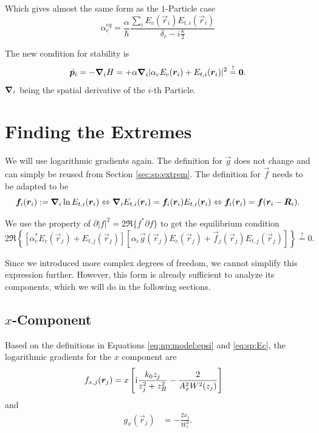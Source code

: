 Which gives almost the same form as the $1$-Particle case
\begin{equation}
    \alpha_c^{eq} = \frac\alpha\hbar \frac{\sum_i E_c(\vec r_i) E_{t,i}(\vec r_i)}{\delta_c - i\frac{\kappa}{2}}
\end{equation}

The new condition for stability is
\begin{equation}
    \dot{\bm{p}_i} 
        = -\bm{\nabla}_{i} H 
        = + \alpha \bm{\nabla}_i|\alpha_c E_c(\bm{r}_i) + E_{t,i}(\bm{r}_i)|^2 \overset{!}{=}\bm{0}.
\end{equation}
$\bm{\nabla}_i$ being the spatial derivative of the $i$-th Particle.

\section{Finding the Extremes}
\label{sec:np:extrem}

We will use logarithmic gradients again.
The definition for $\vec g$ does not change and can simply be reused from Section \ref{sec:sp:extrem}.
The definition for $\vec f$ needs to be adapted to be
\begin{equation}
    \bm{f}_i(\bm{r}_i) := \bm{\nabla}_i \ln E_{t,i}(\bm{r}_i) 
    \Leftrightarrow \bm{\nabla}_i E_{t,i}(\bm{r}_i) = \bm{f}_i(\bm{r}_i) E_{t,i}(\bm{r}_i)
    \Leftrightarrow \bm{f}_i(\bm{r}_i) = \bm{f}(\bm{r}_i-\bm{R}_i).
\end{equation}

We use the property of $\partial |f|^2 = 2\Re\{f^*\partial f\}$ to get the equilibrium condition
\begin{equation}
\label{eq:np:extrem:cond}
    2\Re\left\{ 
        \left[ \alpha_c^* E_c(\vec r_j) + E_{t,j}(\vec r_j) \right]
        \left[ \alpha_c \vec g(\vec r_j)E_c(\vec r_j) + \vec f_j(\vec r_j) E_{t,j}(\vec r_j) \right] 
    \right\} \overset{!}{=} 0.
\end{equation}

Since we introduced more complex degrees of freedom, 
    we cannot simplify this expression further.
However, this form is already sufficient to analyze its components,
    which we will do in the following sections.

\subsection{\texorpdfstring{$x$}{x}-Component}
\label{ssec:np:extrem:x}

Based on the definitions in Equations \eqref{eq:np:model:epsi} and \eqref{eq:sp:Ec}, 
    the logarithmic gradients for the $x$ component are
\begin{align}
    f_{x,j}( \bm{r}_j) &= x \left[\mathrm{i} \frac{k_0z_j}{z_j^2 + z_R^2} - \frac{2}{A_x^2 W^2(z_j)}\right] 
\end{align}
and
\begin{align}
    g_x( \vec r_j) &= -\frac{2x_j}{W_c^2} .
\end{align}

